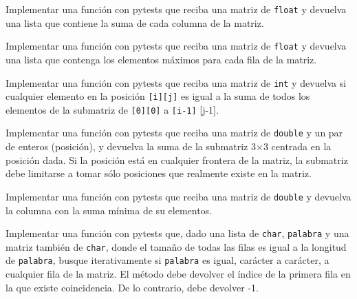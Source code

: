 \begin{ejercicio}Implementar una función con pytests  que reciba una matriz de
  \texttt{float} y devuelva una lista que contiene la suma de cada
  columna de la matriz.
\end{ejercicio}
\begin{ejercicio}Implementar una función con pytests  que reciba una matriz de
  \texttt{float} y devuelva una lista que contenga los elementos
  m\'aximos para cada fila de la matriz.
\end{ejercicio}
\begin{ejercicio}Implementar una función con pytests  que reciba una matriz de
  \verb#int# y devuelva si cualquier elemento en la posici\'on
  \verb#[i][j]# es igual a la suma de todos los elementos de la
  submatriz de \verb#[0][0]# a \verb#[i-1]# [j-1].

\end{ejercicio}
\begin{ejercicio}Implementar una función con pytests  que reciba una matriz de
  \verb#double# y un par de enteros (posici\'on), y devuelva la suma
  de la submatriz 3$\times$3 centrada en la posici\'on dada. Si la
  posici\'on est\'a en cualquier frontera de la matriz, la submatriz debe
  limitarse a tomar s\'olo posiciones que realmente existe en la
  matriz.
\end{ejercicio}

\begin{ejercicio}\label {lastmatrix} Implementar una función con pytests  que reciba
  una matriz de \verb#double# y devuelva la columna con la suma
  m\'inima de su elementos.
\end{ejercicio}

\begin{ejercicio}Implementar una función con pytests que, dado una lista de \verb#char#,
  \verb#palabra# y una matriz tambi\'en de \verb#char#, donde el
  tama\~no de todas las filas es igual a la longitud de
  \verb#palabra#, busque iterativamente si \verb#palabra# es igual,
  carácter a carácter, a cualquier fila de la matriz. El m\'etodo debe
  devolver el \'indice de la primera fila en la que existe
  coincidencia. De lo contrario, debe devolver -1. 

\end{ejercicio}
